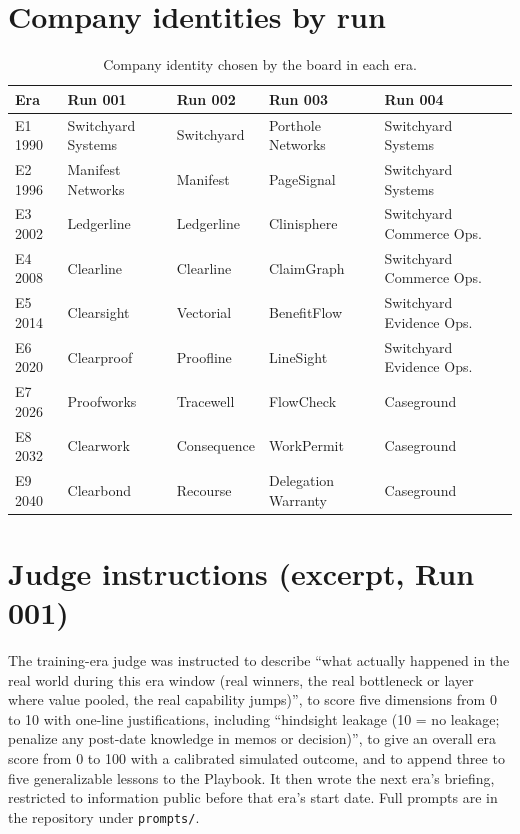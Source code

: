 \documentclass[11pt]{article}
\theoremstyle{definition}
\begin{document}
\section{Company identities by run}
\label{app:identity}

\begin{table}[H]
\centering
\small
\caption{Company identity chosen by the board in each era.}
\begin{tabular}{lllll}
\toprule
Era & Run 001 & Run 002 & Run 003 & Run 004 \\
\midrule
E1 1990 & Switchyard Systems & Switchyard & Porthole Networks & Switchyard Systems \\
E2 1996 & Manifest Networks & Manifest & PageSignal & Switchyard Systems \\
E3 2002 & Ledgerline & Ledgerline & Clinisphere & Switchyard Commerce Ops. \\
E4 2008 & Clearline & Clearline & ClaimGraph & Switchyard Commerce Ops. \\
E5 2014 & Clearsight & Vectorial & BenefitFlow & Switchyard Evidence Ops. \\
E6 2020 & Clearproof & Proofline & LineSight & Switchyard Evidence Ops. \\
E7 2026 & Proofworks & Tracewell & FlowCheck & Caseground \\
E8 2032 & Clearwork & Consequence & WorkPermit & Caseground \\
E9 2040 & Clearbond & Recourse & Delegation Warranty & Caseground \\
\bottomrule
\end{tabular}
\end{table}

\section{Judge instructions (excerpt, Run 001)}

The training-era judge was instructed to describe ``what actually happened in the real world during this era window (real winners, the real bottleneck or layer where value pooled, the real capability jumps)'', to score five dimensions from 0 to 10 with one-line justifications, including ``hindsight leakage (10 = no leakage; penalize any post-date knowledge in memos or decision)'', to give an overall era score from 0 to 100 with a calibrated simulated outcome, and to append three to five generalizable lessons to the Playbook. It then wrote the next era's briefing, restricted to information public before that era's start date. Full prompts are in the repository under \texttt{prompts/}.
\end{document}
